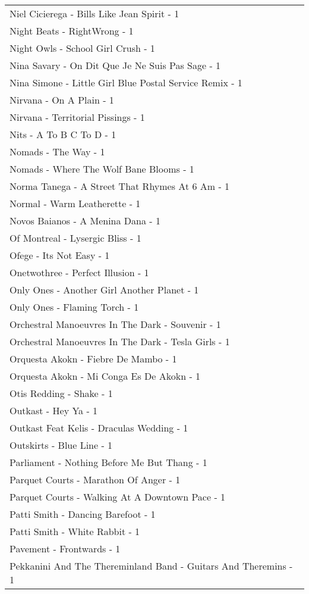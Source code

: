 \documentclass[
]{article}
\begin{document}
\begin{longtable}{l}
Niel Cicierega - Bills Like Jean Spirit - 1 \\ 
Night Beats - RightWrong - 1 \\ 
Night Owls - School Girl Crush - 1 \\ 
Nina Savary - On Dit Que Je Ne Suis Pas Sage - 1 \\ 
Nina Simone - Little Girl Blue Postal Service Remix - 1 \\ 
Nirvana - On A Plain - 1 \\ 
Nirvana - Territorial Pissings - 1 \\ 
Nits - A To B C To D - 1 \\ 
Nomads - The Way - 1 \\ 
Nomads - Where The Wolf Bane Blooms - 1 \\ 
Norma Tanega - A Street That Rhymes At 6 Am - 1 \\ 
Normal - Warm Leatherette - 1 \\ 
Novos Baianos - A Menina Dana - 1 \\ 
Of Montreal - Lysergic Bliss - 1 \\ 
Ofege - Its Not Easy - 1 \\ 
Onetwothree - Perfect Illusion - 1 \\ 
Only Ones - Another Girl Another Planet - 1 \\ 
Only Ones - Flaming Torch - 1 \\ 
Orchestral Manoeuvres In The Dark - Souvenir - 1 \\ 
Orchestral Manoeuvres In The Dark - Tesla Girls - 1 \\ 
Orquesta Akokn - Fiebre De Mambo - 1 \\ 
Orquesta Akokn - Mi Conga Es De Akokn - 1 \\ 
Otis Redding - Shake - 1 \\ 
Outkast - Hey Ya - 1 \\ 
Outkast Feat Kelis - Draculas Wedding - 1 \\ 
Outskirts - Blue Line - 1 \\ 
Parliament - Nothing Before Me But Thang - 1 \\ 
Parquet Courts - Marathon Of Anger - 1 \\ 
Parquet Courts - Walking At A Downtown Pace - 1 \\ 
Patti Smith - Dancing Barefoot - 1 \\ 
Patti Smith - White Rabbit - 1 \\ 
Pavement - Frontwards - 1 \\ 
Pekkanini And The Thereminland Band - Guitars And Theremins - 1 \\ 

\end{longtable}
\end{document}
